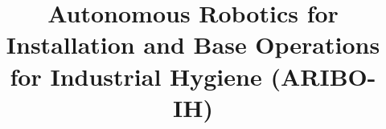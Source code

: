 \title{\LARGE \bf
Autonomous Robotics for Installation and Base Operations \\for Industrial Hygiene (ARIBO-IH)}




